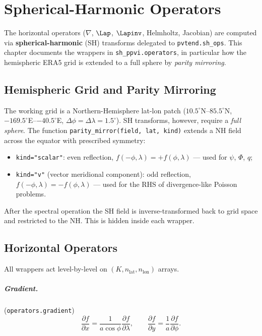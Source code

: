 \chapter{Spherical-Harmonic Operators}
\label{chap:sh}

The horizontal operators ($\nabla$, $\Lap$, $\Lapinv$, Helmholtz,
Jacobian) are computed via \textbf{spherical-harmonic} (SH) transforms
delegated to \texttt{pvtend.sh\_ops}.  This chapter documents the
wrappers in \texttt{sh\_ppvi.operators}, in particular how the
hemispheric ERA5 grid is extended to a full sphere by
\emph{parity mirroring}.

\section{Hemispheric Grid and Parity Mirroring}

The working grid is a Northern-Hemisphere lat-lon patch
($10.5^\circ$N--$85.5^\circ$N, $-169.5^\circ$E--$-40.5^\circ$E,
$\Delta\phi=\Delta\lambda=1.5^\circ$).  SH transforms, however,
require a \emph{full sphere}.  The function
\texttt{parity\_mirror(field, lat, kind)} extends a NH field across
the equator with prescribed symmetry:

\begin{itemize}\setlength\itemsep{0pt}
\item \texttt{kind="scalar"}: even reflection,
      $f(-\phi,\lambda)=+f(\phi,\lambda)$ —
      used for $\psi$, $\Phi$, $q$;
\item \texttt{kind="v"} (vector meridional component):
      odd reflection,
      $f(-\phi,\lambda)=-f(\phi,\lambda)$ — used for the RHS of
      divergence-like Poisson problems.
\end{itemize}

\noindent After the spectral operation the SH field is inverse-transformed
back to grid space and restricted to the NH.  This is hidden inside
each wrapper.

\section{Horizontal Operators}

All wrappers act level-by-level on $(K,n_{\text{lat}},n_{\text{lon}})$
arrays.

\paragraph{Gradient.} (\texttt{operators.gradient})
\begin{equation}
\frac{\partial f}{\partial x}=\frac{1}{a\cos\phi}\frac{\partial f}{\partial\lambda},
\qquad
\frac{\partial f}{\partial y}=\frac{1}{a}\frac{\partial f}{\partial\phi}.
\end{equation}

